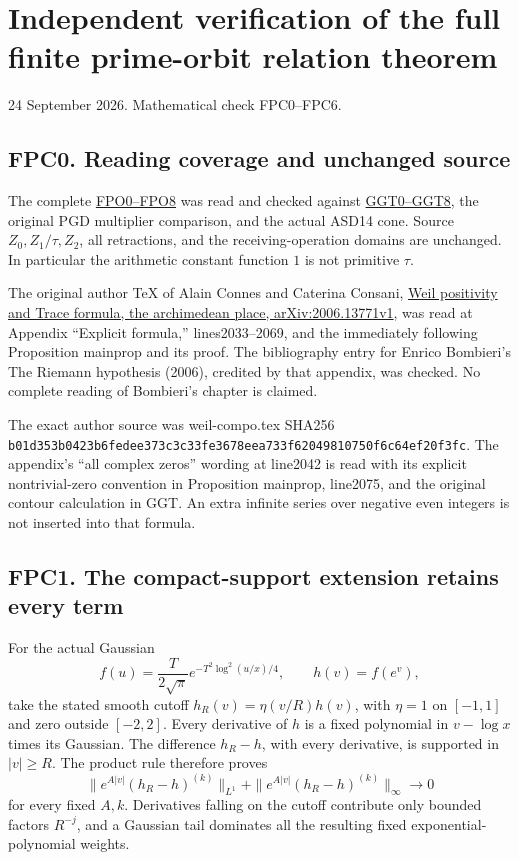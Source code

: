 \section{Independent verification of the full finite prime-orbit
relation
theorem}\label{independent-verification-of-the-full-finite-prime-orbit-relation-theorem}

24 September 2026. Mathematical check FPC0--FPC6.

\subsection{FPC0. Reading coverage and unchanged
source}\label{fpc0.-reading-coverage-and-unchanged-source}

The complete \href{FAITHFUL_GLOBAL_PRIME_ORBIT.md}{FPO0--FPO8} was read
and checked against
\href{GLOBAL_GAUSSIAN_ORIGINAL_ZETA_TRACE.md}{GGT0--GGT8}, the original
PGD multiplier comparison, and the actual ASD14 cone. Source
\(Z_0,Z_1/\tau,Z_2\), all retractions, and the receiving-operation
domains are unchanged. In particular the arithmetic constant function
\(1\) is not primitive \(\tau\).

The original author TeX of Alain Connes and Caterina Consani,
\href{https://arxiv.org/abs/2006.13771v1}{Weil positivity and Trace
formula, the archimedean place, arXiv:2006.13771v1}, was read at
Appendix ``Explicit formula,'' lines2033--2069, and the immediately
following Proposition mainprop and its proof. The bibliography entry for
Enrico Bombieri's The Riemann hypothesis (2006), credited by that
appendix, was checked. No complete reading of Bombieri's chapter is
claimed.

The exact author source was
weil-compo.tex
SHA256 \nolinkurl{b01d353b0423b6fedee373c3c33fe3678eea733f62049810750f6c64ef20f3fc}.
The appendix's ``all complex zeros'' wording at line2042 is read with
its explicit nontrivial-zero convention in Proposition mainprop,
line2075, and the original contour calculation in GGT. An extra infinite
series over negative even integers is not inserted into that formula.

\subsection{FPC1. The compact-support extension retains every
term}\label{fpc1.-the-compact-support-extension-retains-every-term}

For the actual Gaussian \[
f(u)=\frac{T}{2\sqrt\pi}
e^{-T^2\log^2(u/x)/4},\qquad h(v)=f(e^v),
\] take the stated smooth cutoff \(h_R(v)=\eta(v/R)h(v)\), with
\(\eta=1\) on \([-1,1]\) and zero outside \([-2,2]\). Every derivative
of \(h\) is a fixed polynomial in \(v-\log x\) times its Gaussian. The
difference \(h_R-h\), with every derivative, is supported in
\(|v|\ge R\). The product rule therefore proves \[
\|e^{A|v|}(h_R-h)^{(k)}\|_{L^1}
+\|e^{A|v|}(h_R-h)^{(k)}\|_\infty\longrightarrow0
\] for every fixed \(A,k\). Derivatives falling on the cutoff contribute
only bounded factors \(R^{-j}\), and a Gaussian tail dominates all the
resulting fixed exponential-polynomial weights.

